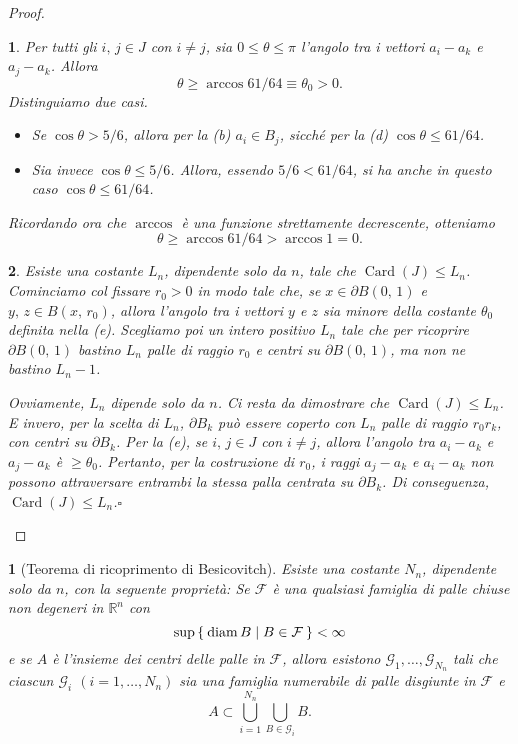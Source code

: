 \documentclass[a4paper,10pt,openright,oneside]{book}
\theoremstyle{theoremstyle}
\theoremstyle{theoremstylewoheader}
\newtheorem{teorema2}[teorema]{}
\theoremstyle{theoremstyle}
\theoremstyle{proofsecstyle}
\newtheorem{proofsec}{}
\theoremstyle{nonumberplain}
\newtheorem{proof}{Dim.}
\newcommand{\FF}{\ensuremath{\mathcal{F}}}
\newcommand{\GG}{\ensuremath{\mathcal{G}}}
\newcommand{\RR}{\ensuremath{\mathbb{R}}}
\newcommand{\boundary}[1]{\ensuremath{\partial #1}}
\DeclareMathOperator{\diam}{diam}
\DeclareMathOperator{\Card}{Card}
\renewcommand{\qedsymbol}{\ensuremath{\square}}
\newcommand{\qed}{\unskip\nobreak\hfill\nobreak\hspace{.5em}\qedsymbol}
\begin{document}
\begin{proof}
\begin{proofsec}
\emph{Per tutti gli $i,\, j \in J$ con $i \ne j$, sia $0 \le \theta \le \pi$ l'angolo tra i vettori $a_i - a_k$ e $a_j - a_k$. Allora}
\[
\theta \ge \arccos 61/64 \equiv \theta_0 > 0.
\]
Distinguiamo due casi.
\begin{itemize}
\item[($\alpha$)] Se $\cos\theta > 5/6$, allora per la (b) $a_i \in B_j$, sicché per la (d) $\cos\theta \le 61/64$.
\item[($\beta$)] Sia invece $\cos\theta \le 5/6$. Allora, essendo $5/6 < 61/64$, si ha anche in questo caso $\cos\theta \le 61/64$.
\end{itemize}
Ricordando ora che $\arccos$ è una funzione strettamente decrescente, otteniamo
\[
\theta \ge \arccos 61/64 > \arccos 1 = 0.
\]
\end{proofsec}

\begin{proofsec}
\emph{Esiste una costante $L_n$, dipendente solo da $n$, tale che $\Card(J) \le L_n$.}\hspace{.5em} Cominciamo col fissare $r_0 > 0$ in modo tale che, se $x \in \boundary{B(0,\, 1)}$ e $y,\, z \in B(x,\, r_0)$, allora l'angolo tra i vettori $y$ e $z$ sia minore della costante $\theta_0$ definita nella (e). Scegliamo poi un intero positivo $L_n$ tale che per ricoprire $\boundary{B(0,\, 1)}$ bastino $L_n$ palle di raggio $r_0$ e centri su $\boundary{B(0,\, 1)}$, ma non ne bastino $L_n - 1$.

Ovviamente, $L_n$ dipende solo da $n$. Ci resta da dimostrare che $\Card(J) \le L_n$. E invero, per la scelta di $L_n$, $\boundary{B_k}$ può essere coperto con $L_n$ palle di raggio $r_0 r_k$, con centri su $\boundary{B_k}$. Per la (e), se $i,\, j \in J$ con $i \ne j$, allora l'angolo tra $a_i - a_k$ e $a_j - a_k$ è $\ge \theta_0$. Pertanto, per la costruzione di $r_0$, i raggi $a_j - a_k$ e $a_i - a_k$ non possono attraversare entrambi la stessa palla centrata su $\boundary{B_k}$.  Di conseguenza, $\Card(J) \le L_n$.\qed
\end{proofsec}
\end{proof}

\begin{teorema2}[Teorema di ricoprimento di Besicovitch]
\label{thm:ricoprimento_besicovitch}
Esiste una costante $N_n$, dipendente solo da $n$, con la seguente proprietà: Se $\FF$ è una qualsiasi famiglia di palle chiuse non degeneri in $\RR^n$ con
\[
\sup\Set{ \diam B | B \in \FF } < \infty
\]
e se $A$ è l'insieme dei centri delle palle in $\FF$, allora esistono $\GG_1, \ldots, \GG_{N_n}$ tali che ciascun $\GG_i$ $(i = 1, \ldots, N_n)$ sia una famiglia \emph{numerabile} di palle \emph{disgiunte} in $\FF$ e
\[
A \subset \bigcup_{i=1}^{N_n} \bigcup_{B \in \GG_i} B.
\]
\end{teorema2}
\end{document}
